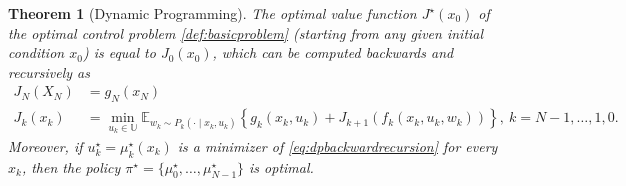 \documentclass[
]{book}
\newtheorem{theorem}{Theorem}[chapter]
\theoremstyle{definition}
\theoremstyle{definition}
\theoremstyle{definition}
\theoremstyle{definition}
\theoremstyle{remark}
\begin{document}
\begin{theorem}[Dynamic Programming]
\protect\hypertarget{thm:dynamicprogramming}{}\label{thm:dynamicprogramming}The optimal value function \(J^\star(x_0)\) of the optimal control problem \ref{def:basicproblem} (starting from any given initial condition \(x_0\)) is equal to \(J_0(x_0)\), which can be computed backwards and recursively as
\begin{align}
J_N(X_N) &= g_N(x_N) \\
J_k(x_k) &= \min_{u_k \in \mathbb{U}} \displaystyle \mathbb{E}_{w_k \sim P_k(\cdot \mid x_k, u_k)} \displaystyle \left\{ g_k(x_k,u_k) + J_{k+1}(f_k(x_k,u_k,w_k) ) \right\}, \ k=N-1,\dots,1,0.
\label{eq:dpbackwardrecursion}
\end{align}
Moreover, if \(u_k^\star = \mu_k^\star(x_k)\) is a minimizer of \eqref{eq:dpbackwardrecursion} for every \(x_k\), then the policy \(\pi^\star = \{\mu_0^\star,\dots,\mu_{N-1}^\star \}\) is optimal.
\end{theorem}
\end{document}
